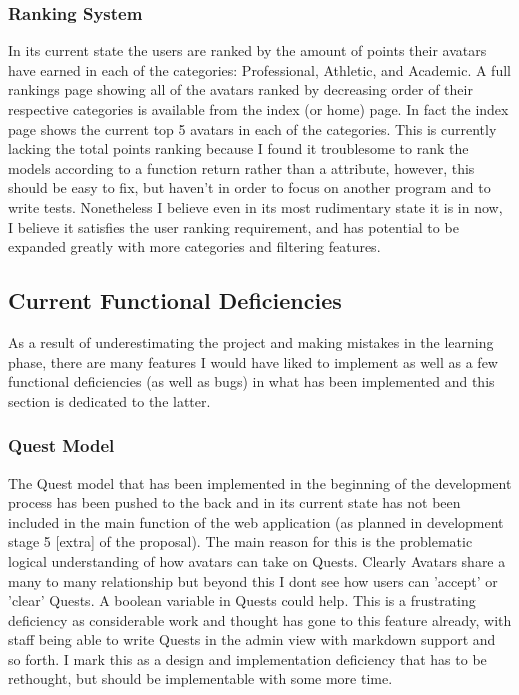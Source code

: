 \documentclass[11pt,a4paper]{article}
\begin{document}
\subsubsection{Ranking System}
In its current state the users are ranked by the amount of points their avatars have earned in each of the categories: Professional, Athletic, and Academic. A full rankings page showing all of the avatars ranked by decreasing order of their respective categories is available from the index (or home) page. In fact the index page shows the current top 5 avatars in each of the categories. This is currently lacking the total points ranking because I found it troublesome to rank the models according to a function return rather than a attribute, however, this should be easy to fix, but haven't in order to focus on another program and to write tests. Nonetheless I believe even in its most rudimentary state it is in now, I believe it satisfies the user ranking requirement, and has potential to be expanded greatly with more categories and filtering features.

\subsection{Current Functional Deficiencies}
As a result of underestimating the project and making mistakes in the learning phase, there are many features I would have liked to implement as well as a few functional deficiencies (as well as bugs) in what has been implemented and this section is dedicated to the latter.

\subsubsection{Quest Model}
The Quest model that has been implemented in the beginning of the development process has been pushed to the back and in its current state has not been included in the main function of the web application (as planned in development stage 5 [extra] of the proposal). The main reason for this is the problematic logical understanding of how avatars can take on Quests. Clearly Avatars share a many to many relationship but beyond this I dont see how users can 'accept' or 'clear' Quests. A boolean variable in Quests could help. This is a frustrating deficiency as considerable work and thought has gone to this feature already, with staff being able to write Quests in the admin view with markdown support and so forth. I mark this as a design and implementation deficiency that has to be rethought, but should be implementable with some more time.
\end{document}

